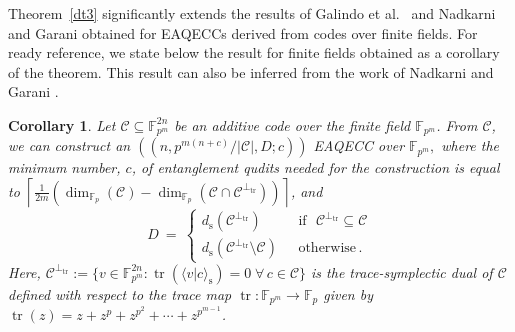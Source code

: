 \documentclass{article}
\DeclareMathOperator{\tr}{tr}
\DeclareMathOperator{\Tr}{Tr}
\DeclareMathOperator{\rank}{rank}
\def\F{\mathbb{F}}
\newtheorem{cor}{Corollary}[section]
\theoremstyle{remark}
\theoremstyle{definition}
\numberwithin{equation}{section}
\begin{document}


Theorem~\ref{dt3} significantly extends the results of Galindo et al.\ \cite{galindo} and Nadkarni and Garani \cite{nadkarni} obtained for EAQECCs derived from codes over finite fields. For ready reference, we state below the result for finite fields obtained as a corollary of the theorem. This result can also be inferred from the work of Nadkarni and Garani \cite{nadkarni}.

\begin{cor}
\label{cor:Fpm}
 Let $\mathcal{C} \subseteq \mathbb{F}_{p^m}^{2n}$ be an additive code over the finite field $\F_{p^m}$. From $\mathcal{C}$, we can construct an  $((n,p^{m(n+c)}/{|\mathcal{C}|} ,D;c))$ EAQECC over $\mathbb{F}_{p^m},$ where the minimum number, $c$, of entanglement qudits needed for the construction is equal to  
$ \left\lceil  \frac{1}{2m} (\dim_{\F_p}(\mathcal{C}) - \dim_{\F_p}(\mathcal{C} \cap \mathcal{C}^{\perp_{{\tr}}})) \right\rceil$, and
\begin{equation*}
D~=~\left\{\begin{array}{ll}
d_{\mathrm{s}}(\mathcal{C}^{\perp_{\tr}}) & \text{~~if~~}  \mathcal{C}^{\perp_{\tr}} \subseteq \mathcal{C}\\ 
d_{\mathrm{s}}(\mathcal{C}^{\perp_{\tr}}\setminus \mathcal{C} )  & \text{~~otherwise}\,.
\end{array}\right. 
\end{equation*}
Here, $\mathcal{C}^{\perp_{\tr}} := \{v \in \mathbb{F}_{p^m} ^{2n} : \tr( \langle v | c\rangle_{\text{s}}) = 0 \; \forall \, c \in \mathcal{C}\}$ is the trace-symplectic dual of $\mathcal{C}$ defined with respect to the trace map $\tr: \F_{p^m} \to \F_p$ given by $\tr(z) = z+z^p+z^{p^2}+\cdots+z^{p^{m-1}}$.
\end{cor}
\end{document}
